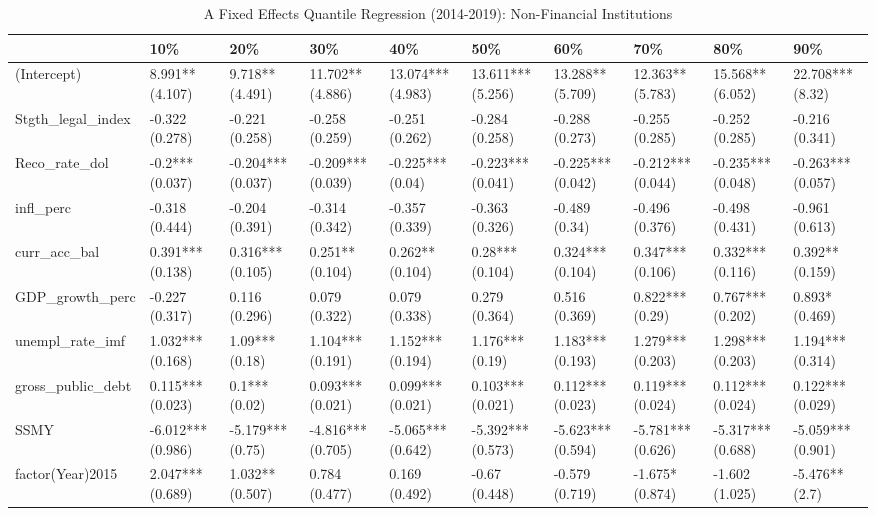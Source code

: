 \begin{table}[ht]
\centering
\caption{A Fixed Effects Quantile Regression (2014-2019): Non-Financial Institutions} 
\begingroup\small
\begin{tabular}{llllllllll}
  \toprule
 & 10\% & 20\% & 30\% & 40\% & 50\% & 60\% & 70\% & 80\% & 90\% \\ 
  \midrule
(Intercept) & 8.991** (4.107) & 9.718** (4.491) & 11.702** (4.886) & 13.074*** (4.983) & 13.611*** (5.256) & 13.288** (5.709) & 12.363** (5.783) & 15.568** (6.052) & 22.708*** (8.32) \\ 
  Stgth\_legal\_index & -0.322 (0.278) & -0.221 (0.258) & -0.258 (0.259) & -0.251 (0.262) & -0.284 (0.258) & -0.288 (0.273) & -0.255 (0.285) & -0.252 (0.285) & -0.216 (0.341) \\ 
  Reco\_rate\_dol & -0.2*** (0.037) & -0.204*** (0.037) & -0.209*** (0.039) & -0.225*** (0.04) & -0.223*** (0.041) & -0.225*** (0.042) & -0.212*** (0.044) & -0.235*** (0.048) & -0.263*** (0.057) \\ 
  infl\_perc & -0.318 (0.444) & -0.204 (0.391) & -0.314 (0.342) & -0.357 (0.339) & -0.363 (0.326) & -0.489 (0.34) & -0.496 (0.376) & -0.498 (0.431) & -0.961 (0.613) \\ 
  curr\_acc\_bal & 0.391*** (0.138) & 0.316*** (0.105) & 0.251** (0.104) & 0.262** (0.104) & 0.28*** (0.104) & 0.324*** (0.104) & 0.347*** (0.106) & 0.332*** (0.116) & 0.392** (0.159) \\ 
  GDP\_growth\_perc & -0.227 (0.317) & 0.116 (0.296) & 0.079 (0.322) & 0.079 (0.338) & 0.279 (0.364) & 0.516 (0.369) & 0.822*** (0.29) & 0.767*** (0.202) & 0.893* (0.469) \\ 
  unempl\_rate\_imf & 1.032*** (0.168) & 1.09*** (0.18) & 1.104*** (0.191) & 1.152*** (0.194) & 1.176*** (0.19) & 1.183*** (0.193) & 1.279*** (0.203) & 1.298*** (0.203) & 1.194*** (0.314) \\ 
  gross\_public\_debt & 0.115*** (0.023) & 0.1*** (0.02) & 0.093*** (0.021) & 0.099*** (0.021) & 0.103*** (0.021) & 0.112*** (0.023) & 0.119*** (0.024) & 0.112*** (0.024) & 0.122*** (0.029) \\ 
  SSMY & -6.012*** (0.986) & -5.179*** (0.75) & -4.816*** (0.705) & -5.065*** (0.642) & -5.392*** (0.573) & -5.623*** (0.594) & -5.781*** (0.626) & -5.317*** (0.688) & -5.059*** (0.901) \\ 
  factor(Year)2015 & 2.047*** (0.689) & 1.032** (0.507) & 0.784 (0.477) & 0.169 (0.492) & -0.67 (0.448) & -0.579 (0.719) & -1.675* (0.874) & -1.602 (1.025) & -5.476** (2.7) \\ 

\end{tabular}
\end{table}
